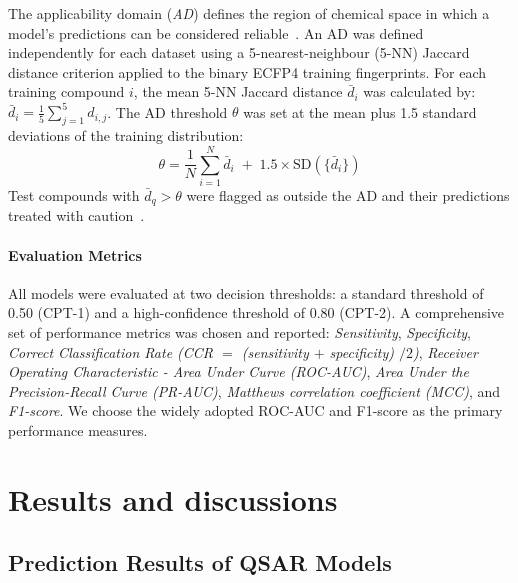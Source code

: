 \documentclass[letterpaper]{article}
\begin{document}
The applicability domain (\emph{AD}) defines the region of chemical space in
which a model's predictions can be considered reliable~\cite{Zhu2016}.
An AD was defined independently for each dataset using a 5-nearest-neighbour (5-NN) Jaccard distance criterion applied to the binary
ECFP4 training fingerprints. For each training compound $i$, the mean
5-NN Jaccard distance $\bar{d}_i$ was calculated by:
    $\bar{d}_i = \frac{1}{5}\sum_{j=1}^{5} d_{i,j}$.
The AD threshold $\theta$ was set at the mean plus 1.5 standard
deviations of the training distribution:
\begin{equation*}
    \theta = \frac{1}{N}\sum_{i=1}^{N}\bar{d}_i
           \;+\; 1.5 \times \mathrm{SD}\!\left(\{\bar{d}_i\}\right)
\end{equation*}
Test compounds with $\bar{d}_q > \theta$ were flagged as outside the
AD and their predictions treated with caution~\cite{Zhu2016}.

\paragraph{Evaluation Metrics}

All models were evaluated at two decision thresholds: a standard
threshold of 0.50 (CPT-1) and a high-confidence threshold of 0.80
(CPT-2). A comprehensive set of performance metrics was chosen and reported: \emph{Sensitivity}, \emph{Specificity}, \emph{Correct
Classification Rate (CCR $=$ (sensitivity $+$ specificity) $/ 2$)},
\emph{Receiver Operating Characteristic - Area Under Curve (ROC-AUC)}, \emph{Area Under the Precision-Recall Curve (PR-AUC)}, \emph{Matthews correlation coefficient (MCC)}, and \emph{F1-score}.
We choose the widely adopted ROC-AUC and F1-score as the primary performance measures.



\section{Results and discussions}
\label{sec:results}




\subsection{Prediction Results of QSAR Models}
\end{document}
